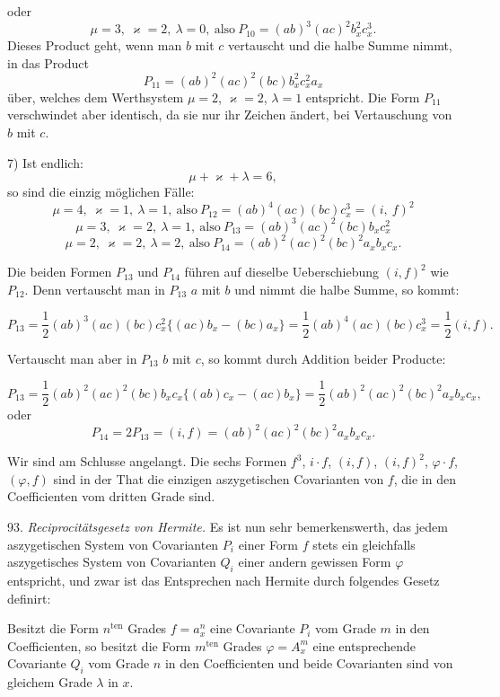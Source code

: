 \documentclass[11pt]{article}
\providecommand{\weberpage}[1]{}
\begin{document}
oder
\[
\mu = 3,\ \varkappa = 2,\ \lambda = 0,\ \text{also}\ P_{10} = (ab)^3 (ac)^2 b_x^2 c_x^3.
\]
Dieses Product geht, wenn man $b$ mit $c$ vertauscht und die halbe Summe nimmt, in das Product
\[
P_{11} = (ab)^2 (ac)^2 (bc) b_x^2 c_x^2 a_x
\]
über, welches dem Werthsystem $\mu = 2$, $\varkappa = 2$, $\lambda = 1$ entspricht. Die Form $P_{11}$ verschwindet aber identisch, da sie nur ihr Zeichen ändert, bei Vertauschung von $b$ mit $c$.

7) Ist endlich:
\[
\mu + \varkappa + \lambda = 6,
\]
so sind die einzig möglichen Fälle:
\[
\mu = 4,\ \varkappa = 1,\ \lambda = 1,\ \text{also}\ P_{12} = (ab)^4 (ac) (bc) c_x^3 = (i,\ f)^2
\]
\[
\mu = 3,\ \varkappa = 2,\ \lambda = 1,\ \text{also}\ P_{13} = (ab)^3 (ac)^2 (bc) b_x c_x^2
\]
\[
\mu = 2,\ \varkappa = 2,\ \lambda = 2,\ \text{also}\ P_{14} = (ab)^2 (ac)^2 (bc)^2 a_x b_x c_x.
\]


\weberpage{97}
Die beiden Formen $P_{13}$ und $P_{14}$ führen auf dieselbe Ueberschiebung $(i,f)^2$ wie $P_{12}$. Denn vertauscht man in $P_{13}$ $a$ mit $b$ und nimmt die halbe Summe, so kommt:

\[
P_{13}=\frac{1}{2}(ab)^3(ac)(bc)c_x^2\{(ac)b_x-(bc)a_x\}=\frac{1}{2}(ab)^4(ac)(bc)c_x^3=\frac{1}{2}(i,f).
\]

Vertauscht man aber in $P_{13}$ $b$ mit $c$, so kommt durch Addition beider Producte:

\[
P_{13}=\frac{1}{2}(ab)^2(ac)^2(bc)b_xc_x\{(ab)c_x-(ac)b_x\}=\frac{1}{2}(ab)^2(ac)^2(bc)^2a_xb_xc_x,
\]
oder
\[
P_{14}=2P_{13}=(i,f)=(ab)^2(ac)^2(bc)^2a_xb_xc_x.
\]

Wir sind am Schlusse angelangt. Die sechs Formen $f^3$, $i\cdot f$, $(i,f)$, $(i,f)^2$, $\varphi\cdot f$, $(\varphi,f)$ sind in der That die einzigen aszygetischen Covarianten von $f$, die in den Coefficienten vom dritten Grade sind.

93. \textit{Reciprocitätsgesetz von Hermite.} Es ist nun sehr bemerkenswerth, das jedem aszygetischen System von Covarianten $P_i$ einer Form $f$ stets ein gleichfalls aszygetisches System von Covarianten $Q_i$ einer andern gewissen Form $\varphi$ entspricht, und zwar ist das Entsprechen nach Hermite durch folgendes Gesetz definirt:

\glqq Besitzt die Form $n^{\mathrm{ten}}$ Grades $f=a_x^n$ eine Covariante $P_i$ vom Grade $m$ in den Coefficienten, so besitzt die Form $m^{\mathrm{ten}}$ Grades $\varphi=A_x^m$ eine entsprechende Covariante $Q_i$ vom Grade $n$ in den Coefficienten und beide Covarianten sind von gleichem Grade $\lambda$ in $x$.\grqq{}
\end{document}
